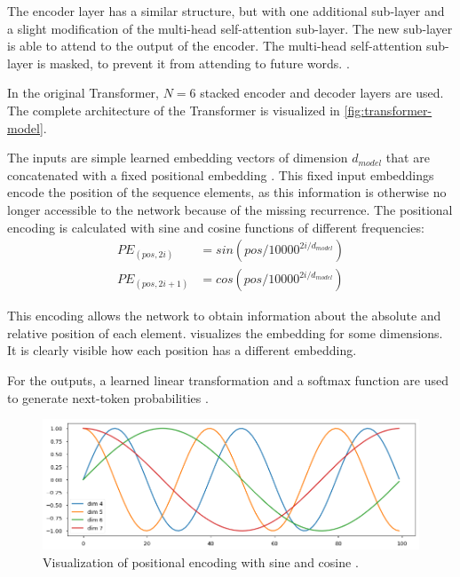 The encoder layer has a similar structure, but with one additional sub-layer and a slight modification of the multi-head self-attention sub-layer.
The new sub-layer is able to attend to the output of the encoder.
The multi-head self-attention sub-layer is masked, to prevent it from attending to future words. \cite[p.~3]{1706.03762}.

In the original Transformer, $N = 6$ stacked encoder and decoder layers are used.
The complete architecture of the Transformer is visualized in \cref{fig:transformer-model}.

The inputs are simple learned embedding vectors of dimension $d_{model}$ that are concatenated with a fixed positional embedding \cite[p.~5--6]{1706.03762}.
This fixed input embeddings encode the position of the sequence elements, as this information is otherwise no longer accessible to the network because of the missing recurrence.
The positional encoding is calculated with sine and cosine functions of different frequencies:
\begin{align*} 
	PE_{(pos,2i)} & = sin(pos/10000^{2i/d_{model}}) \\
	PE_{(pos,2i+1)} & = cos(pos/10000^{2i/d_{model}})
\end{align*}

This encoding allows the network to obtain information about the absolute and relative position of each element.
 visualizes the embedding for some dimensions.
It is clearly visible how each position has a different embedding.

For the outputs, a learned linear transformation and a softmax function are used to generate next-token probabilities \cite[p.~5]{1706.03762}.

\begin{figure}[h]
\centering
\includegraphics[width=0.7\paperwidth]{figures/positional-encoding-sine-cosine}
\caption[Visualization of positional encoding with sine and cosine]{Visualization of positional encoding with sine and cosine \cite{annotated.transformer}.}
\label{fig:positional-encoding-sine-cosine}
\end{figure}

